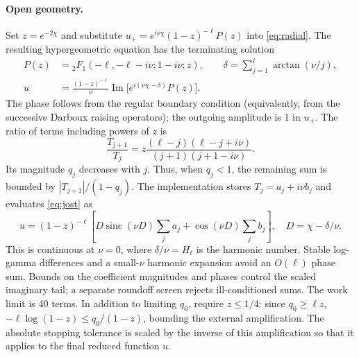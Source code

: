 \documentclass[10pt]{article}
\newcommand{\sinc}{\operatorname{sinc}}
\begin{document}
\paragraph{Open geometry.}
Set $z=e^{-2\chi}$ and substitute $u_+=e^{i\nu\chi}(1-z)^{-\ell}P(z)$
into \eqref{eq:radial}. The resulting hypergeometric equation has the
terminating solution
\begin{align}
 P(z)&={}_2F_1(-\ell,-\ell-i\nu;1-i\nu;z),\qquad
 \delta=\sum_{j=1}^{\ell}\arctan(\nu/j),\\
 u&=\frac{(1-z)^{-\ell}}{\nu}\operatorname{Im}\bigl[e^{i(\nu\chi-\delta)}P(z)\bigr].
 \label{eq:jost}
\end{align}
The phase follows from the regular boundary condition (equivalently, from the
successive Darboux raising operators); the outgoing amplitude is $1$ in $u_+$.
The ratio of terms including powers of $z$ is
\begin{equation}
 \frac{T_{j+1}}{T_j}=z\frac{(\ell-j)(\ell-j+i\nu)}{(j+1)(j+1-i\nu)}.
\end{equation}
Its magnitude $q_j$ decreases with $j$. Thus, when $q_j<1$, the remaining
sum is bounded by $|T_{j+1}|/(1-q_j)$. The implementation stores
$T_j=a_j+i\nu b_j$ and evaluates \eqref{eq:jost} as
\begin{equation}
 u=(1-z)^{-\ell}\left[D\sinc(\nu D)\sum_j a_j+\cos(\nu D)\sum_j b_j\right],
 \quad D=\chi-\delta/\nu.
\end{equation}
This is continuous at $\nu=0$, where $\delta/\nu=H_\ell$ is the harmonic
number. Stable log-gamma differences and a small-$\nu$ harmonic expansion
avoid an $O(\ell)$ phase sum. Bounds on the coefficient magnitudes and phases
control the scaled imaginary tail; a separate roundoff screen rejects
ill-conditioned sums. The work limit is 40 terms. In addition to limiting
$q_0$, require $z\leq1/4$: since $q_0\geq\ell z$,
$-\ell\log(1-z)\leq q_0/(1-z)$, bounding the external amplification. The
absolute stopping tolerance is scaled by the inverse of this amplification
so that it applies to the final reduced function $u$.
\end{document}
